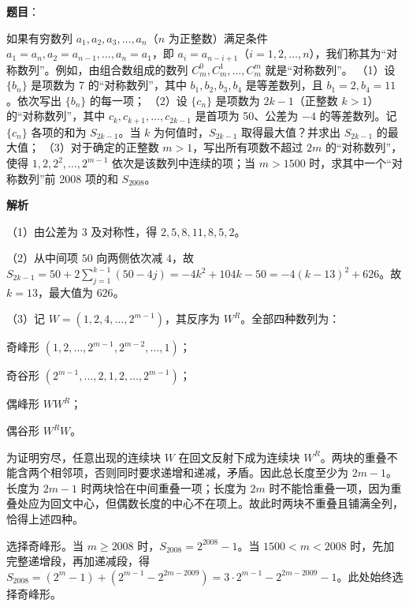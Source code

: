 \begin{answer}

\textbf{题目}：

如果有穷数列 $a_1,a_2,a_3,\ldots,a_n$（$n$ 为正整数）满足条件 $a_1=a_n,a_2=a_{n-1},\ldots,a_n=a_1$，即 $a_i=a_{n-i+1}$（$i=1,2,\ldots,n$），我们称其为“对称数列”。例如，由组合数组成的数列 $C_m^0,C_m^1,\ldots,C_m^m$ 就是“对称数列”。
（1）设 $\{b_n\}$ 是项数为 7 的“对称数列”，其中 $b_1,b_2,b_3,b_4$ 是等差数列，且 $b_1=2,b_4=11$。依次写出 $\{b_n\}$ 的每一项；
（2）设 $\{c_n\}$ 是项数为 $2k-1$（正整数 $k>1$）的“对称数列”，其中 $c_k,c_{k+1},\ldots,c_{2k-1}$ 是首项为 50、公差为 $-4$ 的等差数列。记 $\{c_n\}$ 各项的和为 $S_{2k-1}$。当 $k$ 为何值时，$S_{2k-1}$ 取得最大值？并求出 $S_{2k-1}$ 的最大值；
（3）对于确定的正整数 $m>1$，写出所有项数不超过 $2m$ 的“对称数列”，使得 $1,2,2^2,\ldots,2^{m-1}$ 依次是该数列中连续的项；当 $m>1500$ 时，求其中一个“对称数列”前 2008 项的和 $S_{2008}$。

\textbf{解析}

（1）由公差为 $3$ 及对称性，得 $2,5,8,11,8,5,2$。

（2）从中间项 $50$ 向两侧依次减 $4$，故 $S_{2k-1}=50+2\sum_{j=1}^{k-1}(50-4j)=-4k^2+104k-50=-4(k-13)^2+626$。故 $k=13$，最大值为 $626$。

（3）记 $W=(1,2,4,\ldots,2^{m-1})$，其反序为 $W^R$。全部四种数列为：

奇峰形 $(1,2,\ldots,2^{m-1},2^{m-2},\ldots,1)$；

奇谷形 $(2^{m-1},\ldots,2,1,2,\ldots,2^{m-1})$；

偶峰形 $WW^R$；

偶谷形 $W^RW$。

为证明穷尽，任意出现的连续块 $W$ 在回文反射下成为连续块 $W^R$。两块的重叠不能含两个相邻项，否则同时要求递增和递减，矛盾。因此总长度至少为 $2m-1$。长度为 $2m-1$ 时两块恰在中间重叠一项；长度为 $2m$ 时不能恰重叠一项，因为重叠处应为回文中心，但偶数长度的中心不在项上。故此时两块不重叠且铺满全列，恰得上述四种。

选择奇峰形。当 $m\ge2008$ 时，$S_{2008}=2^{2008}-1$。当 $1500<m<2008$ 时，先加完整递增段，再加递减段，得 $S_{2008}=(2^m-1)+(2^{m-1}-2^{2m-2009})=3\cdot2^{m-1}-2^{2m-2009}-1$。此处始终选择奇峰形。


\end{answer}

